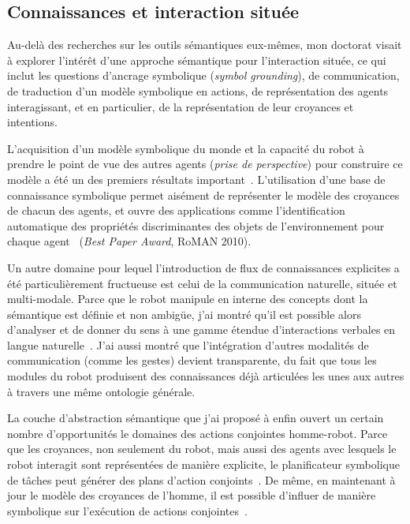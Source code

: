 \documentclass[a4paper]{article}
\begin{document}
\subsection{Connaissances et interaction située%
  \label{semantic-tools-for-grounded-interaction}%
}

Au-delà des recherches sur les outils sémantiques eux-mêmes, mon doctorat visait à
explorer l'intérêt d'une approche sémantique pour l'interaction située, ce qui
inclut les questions d'ancrage symbolique (\emph{symbol grounding}), de
communication, de traduction d'un modèle symbolique en actions, de
représentation des agents interagissant, et en particulier, de la représentation
de leur croyances et intentions.

L'acquisition d'un modèle symbolique du monde et la capacité du robot à prendre
le point de vue des autres agents (\emph{prise de perspective}) pour construire
ce modèle a été un des premiers résultats important~\cite{Lemaignan2011}.
L'utilisation d'une base de connaissance symbolique permet aisément de
représenter le modèle des croyances de chacun des agents, et ouvre des
applications comme l'identification automatique des propriétés discriminantes
des objets de l'environnement pour chaque agent~\cite{ros2010which} (\emph{Best
Paper Award}, RoMAN 2010).

Un autre domaine pour lequel l'introduction de flux de connaissances explicites
a été particulièrement fructueuse est celui de la communication naturelle,
située et multi-modale. Parce que le robot manipule en interne des concepts dont
la sémantique est définie et non ambigüe, j'ai montré qu'il est possible
alors d'analyser et de donner du sens à une gamme étendue d'interactions
verbales en langue naturelle~\cite{Lemaignan2011a, Ros2010a, lemaignan2011what,
lemaignan2011dialogue, lemaignan2013talking}. J'ai aussi montré que
l'intégration d'autres modalités de communication (comme les gestes) devient
transparente, du fait que tous les modules du robot produisent des
connaissances déjà articulées les unes aux autres à travers une même ontologie
générale.

La couche d'abstraction sémantique que j'ai proposé à enfin ouvert un certain
nombre d'opportunités  le domaines des actions conjointes homme-robot. Parce que
les croyances, non seulement du robot, mais aussi des agents avec lesquels le
robot interagit sont représentées de manière explicite, le planificateur
symbolique de tâches peut générer des plans d'action
conjoints~\cite{alami2011when, Lemaignan2012, clodic2013on}. De même, en
maintenant à jour le modèle des croyances de l'homme, il est possible d'influer
de manière symbolique sur l'exécution de actions conjointes~\cite{gharbi2013natural}.
\end{document}
